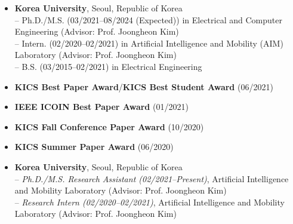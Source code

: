 \documentclass[10pt,letterpaper]{article}
\begin{document}
\spacedhrule{0.0em}{-0.8em}

\begin{itemize}\itemsep=-0.8mm
\item \textbf{Korea University}, Seoul, Republic of Korea
    \\ -- Ph.D./M.S. (03/2021--08/2024 (Expected)) in {Electrical and Computer Engineering} (Advisor: Prof. Joongheon Kim)
    \\ -- Intern. (02/2020--02/2021) in Artificial Intelligence and Mobility (AIM) Laboratory (Advisor: Prof. Joongheon Kim)
    \\ -- B.S. (03/2015--02/2021) in Electrical Engineering 
\end{itemize}


\spacedhrule{0.0em}{-0.8em}

\begin{itemize}\itemsep=-0.8mm
\item \textbf{KICS Best Paper Award}/\textbf{KICS Best Student Award} (06/2021)
\item \textbf{IEEE ICOIN Best Paper Award} (01/2021)
\item \textbf{KICS Fall Conference Paper Award} (10/2020)
\item \textbf{KICS Summer Paper Award} (06/2020)
  \end{itemize}

\spacedhrule{0.0em}{-0.8em}

\begin{itemize}\itemsep=-0.8mm
    \item \textbf{Korea University}, Seoul, Republic of Korea
    \\ -- \textit{Ph.D./M.S. Research Assistant (02/2021--Present)}, Artificial Intelligence and Mobility Laboratory (Advisor: Prof. Joongheon Kim)
    \\ -- \textit{Research Intern (02/2020--02/2021)}, Artificial Intelligence and Mobility Laboratory (Advisor: Prof. Joongheon Kim)
\end{itemize}
\iffalse
\spacedhrule{0.0em}{-0.8em}
\end{document}
